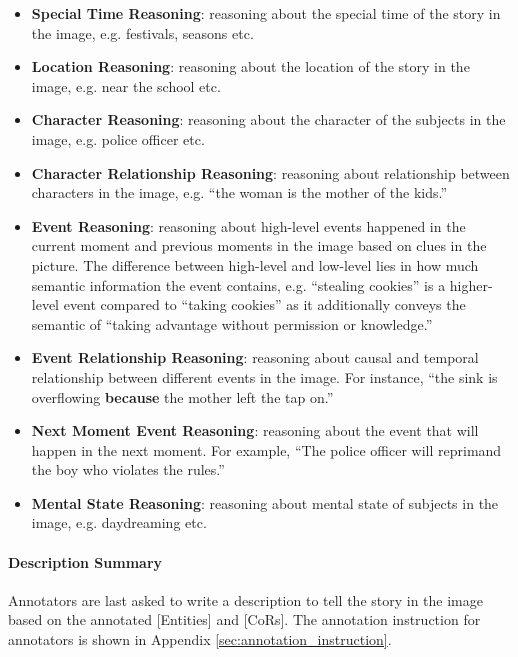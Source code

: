 \begin{itemize}
  \item \textbf{Special Time Reasoning}: reasoning about the special time of the story in the image, e.g. festivals, seasons etc.
  \item \textbf{Location Reasoning}: reasoning about the location of the story in the image, e.g. near the school etc.
  \item \textbf{Character Reasoning}: reasoning about the character of the subjects in the image, e.g. police officer etc.
  \item \textbf{Character Relationship Reasoning}: reasoning about relationship between characters in the image, e.g. ``the woman is the mother of the kids.''
  \item \textbf{Event Reasoning}: reasoning about high-level events happened in the current moment and previous moments in the image based on clues in the picture. The difference between high-level and low-level lies in how much semantic information the event contains, e.g. ``stealing cookies'' is a higher-level event compared to ``taking cookies'' as it additionally conveys the semantic of ``taking advantage without permission or knowledge.''
  \item \textbf{Event Relationship Reasoning}: reasoning about causal and temporal relationship between different events in the image. For instance, ``the sink is overflowing \textbf{because} the mother left the tap on.'' 
  \item \textbf{Next Moment Event Reasoning}: reasoning about the event that will happen in the next moment. For example, ``The police officer will reprimand the boy who violates the rules.''
  \item \textbf{Mental State Reasoning}: reasoning about mental state of subjects in the image, e.g. daydreaming etc.
\end{itemize}

\paragraph{Description Summary} Annotators are last asked to write a description to tell the story in the image based on the annotated [Entities] and [CoRs].
The annotation instruction for annotators is shown in Appendix \ref{sec:annotation_instruction}. 


